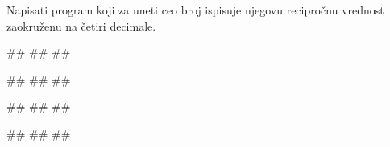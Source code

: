 \begin{Exercise}[label=v1.2_02] 
Napisati program koji za uneti ceo broj ispisuje njegovu recipročnu vrednost zaokruženu na četiri decimale.

\begin{miditest}
\begin{upotreba}{1}
#\naslovInt#
##
##
\end{upotreba}
\end{miditest}
\begin{miditest}
\begin{upotreba}{2}
#\naslovInt#
##
##
\end{upotreba}
\end{miditest}

\begin{miditest}
\begin{upotreba}{3}
#\naslovInt#
##
##
\end{upotreba}
\end{miditest}
\begin{miditest}
\begin{upotreba}{4}
#\naslovInt#
##
##
\end{upotreba}
\end{miditest}

\end{Exercise}
\ifresenja
 \begin{Answer}[ref=v1.2_02]
\end{Answer}
\fi

